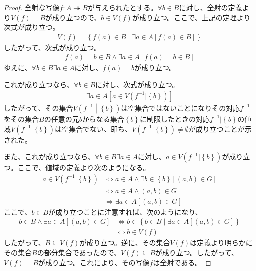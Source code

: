 \documentclass[dvipdfmx]{jsarticle}
\begin{document}
\begin{proof}
全射な写像$f:A \twoheadrightarrow B$が与えられたとする。$\forall b \in B$に対し、全射の定義より$V(f) = B$が成り立つので、$b \in V(f)$が成り立つ。ここで、上記の定理より次式が成り立つ。
\begin{align*}
V(f) = \left\{ f(a) \in B \middle| \exists a \in A\left[ f(a) \in B \right] \right\}
\end{align*}
したがって、次式が成り立つ。
\begin{align*}
f(a) = b \in B \land \exists a \in A\left[ f(a) = b \in B \right]
\end{align*}
ゆえに、$\forall b \in B\exists a \in A$に対し、$f(a) = b$が成り立つ。\par
これが成り立つなら、$\forall b \in B$に対し、次式が成り立つ。
\begin{align*}
\exists a \in A\left[ a \in V\left( f^{- 1}|\left\{ b \right\} \right) \right]
\end{align*}
したがって、その集合$V\left( f^{- 1} \middle| \left\{ b \right\} \right)$は空集合ではないことになりその対応$f^{- 1}$をその集合$B$の任意の元$b$からなる集合$\left\{ b \right\}$に制限したときの対応$f^{- 1}|\left\{ b \right\}$の値域$V\left( f^{- 1}|\left\{ b \right\} \right)$は空集合でない、即ち、$V\left( f^{- 1}|\left\{ b \right\} \right) \neq \emptyset$が成り立つことが示された。\par
また、これが成り立つなら、$\forall b \in B\exists a \in A$に対し、$a \in V\left( f^{- 1}|\left\{ b \right\} \right)$が成り立つ。ここで、値域の定義より次のようになる。
\begin{align*}
a \in V\left( f^{- 1}|\left\{ b \right\} \right) &\Leftrightarrow a \in A \land \exists b \in \left\{ b \right\}\left[ (a,b) \in G \right]\\
&\Leftrightarrow a \in A \land (a,b) \in G\\
&\Rightarrow \exists a \in A\left[ (a,b) \in G \right]
\end{align*}
ここで、$b \in B$が成り立つことに注意すれば、次のようになり、
\begin{align*}
b \in B \land \exists a \in A\left[ (a,b) \in G \right] &\Leftrightarrow b \in \left\{ b \in B \middle| \exists a \in A\left[ (a,b) \in G \right] \right\}\\
&\Leftrightarrow b \in V(f)
\end{align*}
したがって、$B \subseteq V(f)$が成り立つ。逆に、その集合$V(f)$は定義より明らかにその集合$B$の部分集合であったので、$V(f) \subseteq B$が成り立つ。したがって、$V(f) = B$が成り立つ。これにより、その写像$f$は全射である。
\end{proof}
\end{document}
